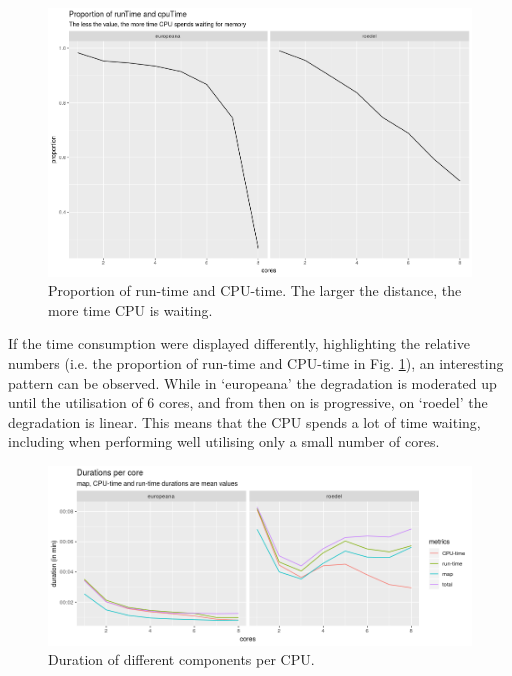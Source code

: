 \begin{figure}
\includegraphics[width=\textwidth]{images/chapter06/runtime-vs-cputime.png}
\caption{Proportion of run-time and CPU-time. The larger the distance, the more time CPU is waiting.}
\label{figure:runtime-vs-cputime}
\end{figure}

If the time consumption were displayed differently, highlighting the relative numbers (i.e. the proportion of run-time and CPU-time in Fig. \ref{figure:runtime-vs-cputime}), an interesting pattern can be observed. While in `europeana' the degradation is moderated up until the utilisation of 6 cores, and from then on is progressive, on `roedel' the degradation is linear. This means that the CPU spends a lot of time waiting, including when performing well utilising only a small number of cores.

\begin{figure}
\includegraphics[width=\textwidth]{images/chapter06/all-durations.png}
\caption{Duration of different components per CPU.}
\label{figure:all-durations}
\end{figure}

